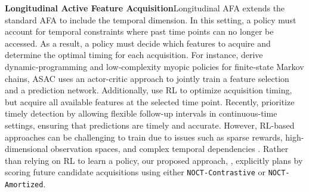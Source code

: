 \textbf{Longitudinal Active Feature Acquisition}\quad Longitudinal AFA extends the standard AFA to include the temporal dimension. \quad
In this setting, a policy must account for temporal constraints where past time points can no longer be accessed. As a result, a policy must decide which features to acquire and determine the optimal timing for each acquisition. For instance, \citet{zois2017active} derive dynamic‑programming and low‑complexity myopic policies for finite‑state Markov chains, ASAC \citep{yoon2019asac} uses an actor-critic approach to jointly train a feature selection and a prediction network. Additionally, \citet{nguyen2024active} use RL to optimize acquisition timing, but acquire all available features at the selected time point. Recently, \citet{qin2024risk} prioritize timely detection by allowing flexible follow-up intervals in continuous-time settings, ensuring that predictions are timely and accurate. However, RL-based approaches can be challenging to train due to issues such as sparse rewards, high-dimensional observation spaces, and complex temporal dependencies \citep{li2021active}. Rather than relying on RL to learn a policy, our proposed approach, \texttt{\OurMethod}, explicitly 
plans by scoring future candidate acquisitions using either \texttt{NOCT-Contrastive} or \texttt{NOCT-Amortized}.

